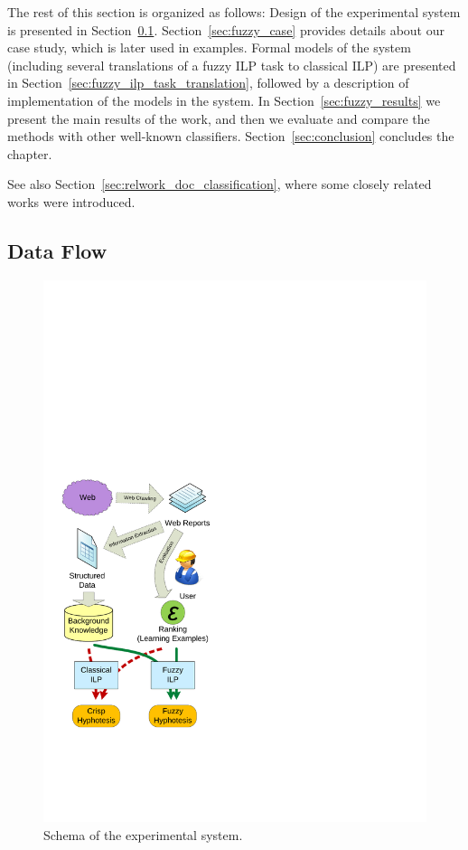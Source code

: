 The rest of this section is organized as follows: Design of the experimental system is presented in Section~\ref{sec:fuzzy_system}. %
Section~\ref{sec:fuzzy_case} provides details about our case study, which is later used in examples. Formal models of the system (including several translations of a fuzzy ILP task to classical ILP) are presented in Section~\ref{sec:fuzzy_ilp_task_translation}, followed by a description of implementation of the models in the system. In Section~\ref{sec:fuzzy_results} we present the main results of the work, and then we evaluate and compare the methods with other well-known classifiers. Section~\ref{sec:conclusion} concludes the chapter.

See also Section~\ref{sec:relwork_doc_classification}, where some closely related works were introduced. 

 



\subsection{Data Flow} \label{sec:fuzzy_system}
\begin{figure}
\centerline{\includegraphics[width=0.4\hsize]{schema}}
\caption{Schema of the experimental system.}
\label{fig:schema}
\end{figure}



